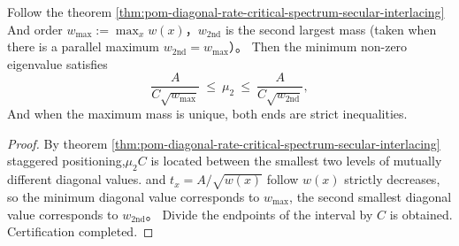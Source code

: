 \begin{corollary}\label{cor:pom-diagonal-rate-critical-spectrum-gap-bounds}
Follow the theorem \ref{thm:pom-diagonal-rate-critical-spectrum-secular-interlacing} And order \(w_{\max}:=\max_x w(x)\)，\(w_{\mathrm{2nd}}\) is the second largest mass (taken when there is a parallel maximum \(w_{\mathrm{2nd}}=w_{\max}\)）。
Then the minimum non-zero eigenvalue satisfies
\[
\frac{A}{C\sqrt{w_{\max}}}\ \le\ \mu_2\ \le\ \frac{A}{C\sqrt{w_{\mathrm{2nd}}}},
\]
And when the maximum mass is unique, both ends are strict inequalities.
\end{corollary}
\begin{proof}
By theorem \ref{thm:pom-diagonal-rate-critical-spectrum-secular-interlacing} staggered positioning,\(\mu_2 C\) is located between the smallest two levels of mutually different diagonal values.
and \(t_x=A/\sqrt{w(x)}\) follow \(w(x)\) strictly decreases, so the minimum diagonal value corresponds to \(w_{\max}\), the second smallest diagonal value corresponds to \(w_{\mathrm{2nd}}\)。
Divide the endpoints of the interval by \(C\) is obtained. Certification completed.
\end{proof}

